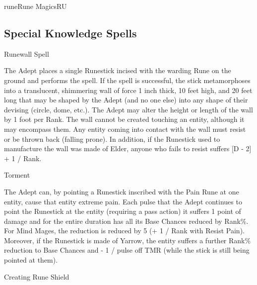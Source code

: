\begin{college}[1.1]{rune}{Rune Magics}{RU}
\subsection{Special Knowledge Spells}

\begin{spell}[S-1]{Runewall Spell}

\begin{effects}
The Adept places a single Runestick incised with the warding Rune on
the ground and performs the spell.  If the spell is successful, the
stick metamorphoses into a translucent, shimmering wall of force 1
inch thick, 10 feet high, and 20 feet long that may be shaped by the
Adept (and no one else) into any shape of their devising (\eg circle,
dome, etc.).  The Adept may alter the height or length of the wall by
1 foot per Rank.  The wall cannot be created touching an entity,
although it may encompass them.  Any entity coming into contact with
the wall must resist or be thrown back (falling prone).  In addition,
if the Runestick used to manufacture the wall was made of Elder,
anyone who fails to resist suffers [D - 2] + 1 / Rank.
\end{effects}
\end{spell}

\begin{spell}[S-2]{Torment}

\begin{effects}
The Adept can, by pointing a Runestick inscribed with the Pain Rune at
one entity, cause that entity extreme pain.  Each pulse that the Adept
continues to point the Runestick at the entity (requiring a pass
action) it suffers 1 point of damage and for the entire duration has
all its Base Chances reduced by Rank\%.  For Mind Mages, the reduction
is reduced by 5 (+ 1 / Rank with Resist Pain).  Moreover, if the
Runestick is made of Yarrow, the entity suffers a further Rank\%
reduction to Base Chances and - 1 / pulse off TMR (while the stick is
still being pointed at them).
\end{effects}
\end{spell}

\begin{spell}[S-3]{Creating Rune Shield}


\end{spell}
\end{college}
